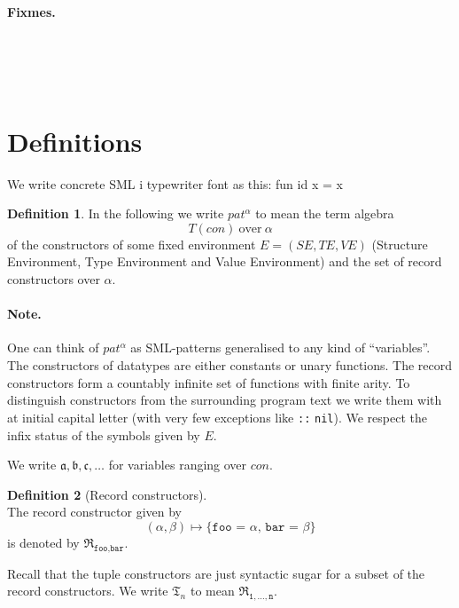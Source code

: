 \documentclass[oneside]{memoir}
\newenvironment{code}
{\quote\Verbatim}
{\endquote\endVerbatim}
\newcommand{\codeinline}[1]{\texttt{#1}}
\theoremstyle{definition}
\newtheorem{definition}{Definition}
\begin{document}
\listoffixmes{}

\paragraph{Fixmes.} \ \\
 \ \\

 \ \\

\section{Definitions}
We write concrete SML i typewriter font as this:
\begin{code}
fun id x = x
\end{code}

\begin{definition}
In the following we write $pat^\alpha$ to mean the term algebra
\[
T(con)\ \text{over}\ \alpha
\]
of the constructors of some fixed environment $E = (S\!E, T\!E, V\!E)$ (Structure
Environment, Type Environment and Value Environment) and the set of record
constructors over $\alpha$. 

\end{definition}

\paragraph{Note.} One can think of $pat^\alpha$ as SML-patterns generalised to
any kind of ``variables''. The constructors of datatypes are either constants or
unary functions. The record constructors form a countably infinite set of
functions with finite arity. To distinguish constructors from the surrounding
program text we write them with at initial capital letter (with very few
exceptions like \codeinline{::} \codeinline{nil}). We respect the infix status
of the symbols given by $E$.

We write $\mathfrak{a}, \mathfrak{b}, \mathfrak{c}, \ldots$ for variables ranging
over $con$.

\begin{definition}[Record constructors] \ \\
  The record constructor given by
  \[
  (\alpha, \beta) \mapsto \texttt{\{foo = $\alpha$, bar = $\beta$\}}
  \]
  is denoted by $\mathfrak{R}_{\texttt{foo},\texttt{bar}}$.

  Recall that the tuple constructors are just syntactic sugar for a subset of
  the record constructors. We write $\mathfrak{T}_n$ to mean
  $\mathfrak{R}_{\texttt{1},\ldots,\texttt{n}}$.
\end{definition}
\end{document}
